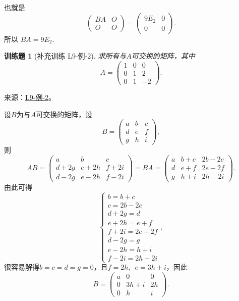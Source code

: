 \documentclass[UTF8,12pt,a4paper,fontset=fandol]{ctexart}
\newtheorem{exercise}{训练题}[section]
\begin{document}
\begin{solve}
            也就是 \[\begin{pmatrix}BA & O \\ O & O\end{pmatrix}=\begin{pmatrix}9E_2 & 0 \\ 0 & 0\end{pmatrix}.\]
            所以 $BA=9E_2$.
\end{solve}

\begin{exercise}[补充训练 L9-例-2]\label{prob:L9-例-2}
求所有与$A$可交换的矩阵，其中
    \[A=\begin{pmatrix}
            1 & 0 & 0  \\
            0 & 1 & 2  \\
            0 & 1 & -2
        \end{pmatrix}.\]
\end{exercise}
\noindent 来源：\href{https://github.com/yhwu-is/Linear-Algebra-Left-Undone/blob/new/%E8%AE%B2%E4%B9%89/%E4%B8%93%E9%A2%98/9%20%E7%9F%A9%E9%98%B5%E8%BF%90%E7%AE%97%E8%BF%9B%E9%98%B6.tex}{L9-例-2}。
\begin{solve}
设$B$为与$A$可交换的矩阵，设
    \[B=\begin{pmatrix}
            a & b & c \\
            d & e & f \\
            g & h & i
        \end{pmatrix},\]
    则
    \[AB=\begin{pmatrix}
            a    & b    & c    \\
            d+2g & e+2h & f+2i \\
            d-2g & e-2h & f-2i
        \end{pmatrix}=BA=\begin{pmatrix}
            a & b+c & 2b-2c \\
            d & e+f & 2e-2f \\
            g & h+i & 2h-2i
        \end{pmatrix}.\]
    由此可得
    \[\begin{cases}
            b=b+c      \\
            c=2b-2c    \\
            d+2g=d     \\
            e+2h=e+f   \\
            f+2i=2e-2f \\
            d-2g=g     \\
            e-2h=h+i   \\
            f-2i=2h-2i
        \end{cases},\]
    很容易解得$b=c=d=g=0$，且$f=2h,\enspace e=3h+i$，因此
    \[B=\begin{pmatrix}
            a & 0    & 0  \\
            0 & 3h+i & 2h \\
            0 & h    & i
        \end{pmatrix}.\]
\end{solve}
\end{document}
